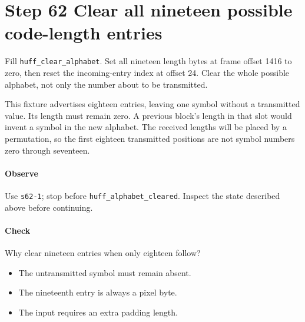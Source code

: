 \section{Step 62 Clear all nineteen possible code-length entries}\label{png-huff-s62}
Fill \texttt{huff\_clear\_alphabet}. Set all nineteen length bytes at frame offset 1416 to zero, then reset the incoming-entry index at offset 24. Clear the whole possible alphabet, not only the number about to be transmitted.

This fixture advertises eighteen entries, leaving one symbol without a transmitted value. Its length must remain zero. A previous block's length in that slot would invent a symbol in the new alphabet. The received lengths will be placed by a permutation, so the first eighteen transmitted positions are not symbol numbers zero through seventeen.

\paragraph{Observe} Use \texttt{s62-1}; stop before \texttt{huff\_alphabet\_cleared}. Inspect the state described above before continuing.

\paragraph{Check} Why clear nineteen entries when only eighteen follow?
\begin{itemize}
  \item[A.] The untransmitted symbol must remain absent.
  \item[B.] The nineteenth entry is always a pixel byte.
  \item[C.] The input requires an extra padding length.
\end{itemize}
